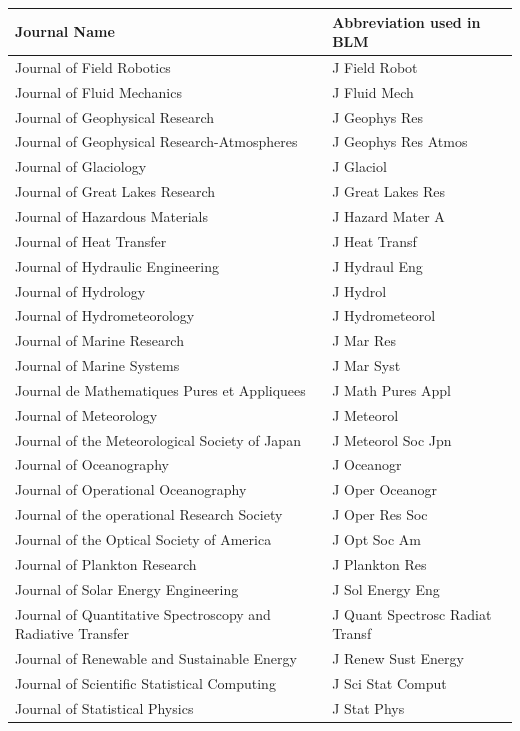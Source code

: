 \begin{longtable}{| p{8 cm} | p{6 cm} |}
\hline
Journal Name & Abbreviation used in BLM \\
\hline

Journal of Field Robotics & J Field Robot \\
Journal of Fluid Mechanics & J Fluid Mech \\
Journal of Geophysical Research & J Geophys Res \\
Journal of Geophysical Research-Atmospheres & J Geophys Res Atmos \\
Journal of Glaciology & J Glaciol \\
Journal of Great Lakes Research & J Great Lakes Res \\
Journal of Hazardous Materials & J Hazard Mater A \\
Journal of Heat Transfer & J Heat Transf \\
Journal of Hydraulic Engineering & J Hydraul Eng \\
Journal of Hydrology & J Hydrol \\
Journal of Hydrometeorology & J Hydrometeorol \\
Journal of Marine Research & J Mar Res \\
Journal of Marine Systems & J Mar Syst \\
Journal de Mathematiques Pures et Appliquees & J Math Pures Appl \\
Journal of Meteorology & J Meteorol \\
Journal of the Meteorological Society of Japan & J Meteorol Soc Jpn \\
Journal of Oceanography & J Oceanogr \\
Journal of Operational Oceanography & J Oper Oceanogr \\
Journal of the operational Research Society & J Oper Res Soc \\
Journal of the Optical Society of America & J Opt Soc Am \\
Journal of Plankton Research & J Plankton Res \\
Journal of Solar Energy Engineering & J Sol Energy Eng \\
Journal of Quantitative Spectroscopy and Radiative Transfer & J Quant Spectrosc Radiat Transf \\
Journal of Renewable and Sustainable Energy & J Renew Sust Energy \\
Journal of Scientific Statistical Computing & J Sci Stat Comput \\
Journal of Statistical Physics & J Stat Phys \\

\end{longtable}
